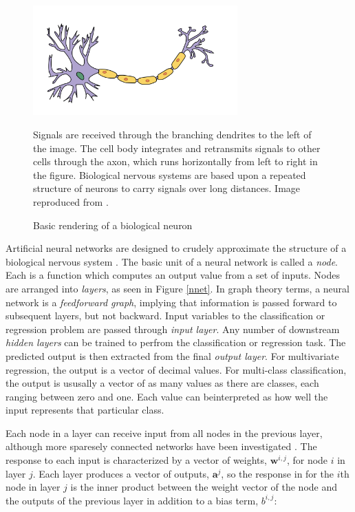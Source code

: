 \begin{figure}
  \begin{center}
    \includegraphics[width=0.7\textwidth]{figures/figures/neuron.png}
  \end{center}
  \caption{Basic rendering of a biological neuron}{Signals are received through the branching dendrites to the left of the image.  The cell body integrates and retransmits signals to other cells through the axon, which runs horizontally from left to right in the figure.  Biological nervous systems are based upon a repeated structure of neurons to carry signals over long distances.
  Image reproduced from \cite{neuronWikiCitation}.}

  \label{neuron}
\end{figure}

Artificial neural networks are designed to crudely approximate the structure of a biological nervous system \cite{reed1999neural}.  The basic unit of a neural network is called a \textit{node}.  Each is a function which computes an output value from a set of inputs.  Nodes are arranged into \textit{layers}, as seen in Figure \ref{nnet}.  In graph theory terms, a neural network is a \textit{feedforward graph}, implying that information is passed forward to subsequent layers, but not backward.  Input variables to the classification or regression problem are passed through \textit{input layer}.  Any number of downstream \textit{hidden layers} can be trained to perfrom the classification or regression task.  The predicted output is then extracted from the final \textit{output layer}.  For multivariate regression, the output is a vector of decimal values.  For multi-class classification, the output is ususally a vector of as many values as there are classes, each ranging between zero and one.
Each value can beinterpreted as how well the input represents that particular
class.

Each node in a layer can receive input from all nodes in the previous layer, although more sparesely connected networks have been investigated
\cite{reed1999neural}.
The response to each input is characterized by a vector of weights,
$\mathbf{w}^{i,j}$, for node $i$ in layer $j$.  Each layer produces a vector of outputs, $\mathbf{a}^{j}$, so the response in for the $i$th node in layer $j$ is the inner product between the weight vector of the node and the outputs of the previous layer in addition to a bias term, $b^{i,j}$:

